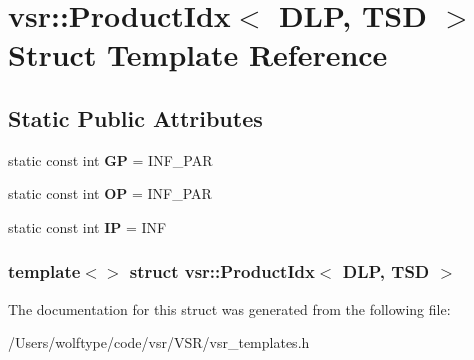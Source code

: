 \hypertarget{structvsr_1_1_product_idx_3_01_d_l_p_00_01_t_s_d_01_4}{\section{vsr\-:\-:Product\-Idx$<$ D\-L\-P, T\-S\-D $>$ Struct Template Reference}
\label{structvsr_1_1_product_idx_3_01_d_l_p_00_01_t_s_d_01_4}
}
\subsection*{Static Public Attributes}
\begin{DoxyCompactItemize}
\item 
\hypertarget{structvsr_1_1_product_idx_3_01_d_l_p_00_01_t_s_d_01_4_aaf434a87f959d9e0278eecb82e8bae11}{static const int {\bfseries G\-P} = I\-N\-F\-\_\-\-P\-A\-R}\label{structvsr_1_1_product_idx_3_01_d_l_p_00_01_t_s_d_01_4_aaf434a87f959d9e0278eecb82e8bae11}

\item 
\hypertarget{structvsr_1_1_product_idx_3_01_d_l_p_00_01_t_s_d_01_4_a864f4dc6fd08bcd4517054e827c9a7fa}{static const int {\bfseries O\-P} = I\-N\-F\-\_\-\-P\-A\-R}\label{structvsr_1_1_product_idx_3_01_d_l_p_00_01_t_s_d_01_4_a864f4dc6fd08bcd4517054e827c9a7fa}

\item 
\hypertarget{structvsr_1_1_product_idx_3_01_d_l_p_00_01_t_s_d_01_4_ad5ea10eb8fef5b27193d0fc2c0115981}{static const int {\bfseries I\-P} = I\-N\-F}\label{structvsr_1_1_product_idx_3_01_d_l_p_00_01_t_s_d_01_4_ad5ea10eb8fef5b27193d0fc2c0115981}

\end{DoxyCompactItemize}
\subsubsection*{template$<$$>$ struct vsr\-::\-Product\-Idx$<$ D\-L\-P, T\-S\-D $>$}



The documentation for this struct was generated from the following file\-:\begin{DoxyCompactItemize}
\item 
/\-Users/wolftype/code/vsr/\-V\-S\-R/vsr\-\_\-templates.\-h\end{DoxyCompactItemize}
